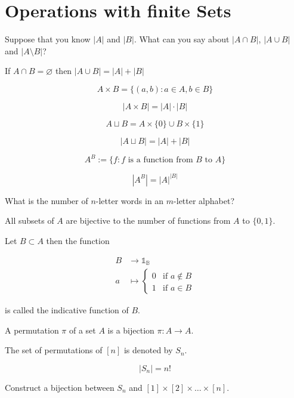 \section{Operations with finite Sets}
\begin{exercise}
Suppose that you know $|A|$ and $|B|$. What can you say about $|A\cap B|$, $|A\cup B|$ and $|A\setminus B|$?
\end{exercise}
\begin{definition}
If $A\cap B=\varnothing$ then $|A\cup B|=|A|+|B|$
\end{definition}
\begin{definition}
$$
A\times B=\{ (a,b):a\in A,b\in B \}
$$
\end{definition}
\begin{definition}
$$
|A\times B|=|A|\cdot |B|
$$
\end{definition}
\begin{definition}
$$
A\sqcup B=A\times \{ 0 \}\cup B\times \{ 1 \}
$$
\end{definition}
\begin{theorem}
$$
|A\sqcup B|=|A|+|B|
$$
\end{theorem}
\begin{definition}
$$
A^{B}:= \{ f:f\text{ is a function from }B \text{ to }A \}
$$
\end{definition}
\begin{theorem}
$$
|A^{B}|=|A|^{|B|}
$$
\end{theorem}
\begin{exercise}
What is the number of $n$-letter words in an $m$-letter alphabet?
\end{exercise}
\begin{remark}
All subsets of $A$ are bijective to the number of functions from $A$ to $\{ 0,1 \}$.

Let $B\subset A$ then the function

\begin{align*}
B & \to \mathbb{1_{B}} \\
a & \mapsto \begin{cases}
0 & \text{if } a\not\in B \\
1  & \text{if }a\in B
\end{cases}
\end{align*}

is called the indicative function of $B$.
\end{remark}
\begin{definition}
A permutation $\pi$ of a set $A$ is a bijection $\pi:A\to A$.
\end{definition}
\begin{notation}
The set of permutations of $[n]$ is denoted by $S_{n}$.
\end{notation}
\begin{theorem}
$$
|S_{n}|=n!
$$
\end{theorem}
\begin{exercise}
Construct a bijection between $S_{n}$ and $[1]\times[2]\times\dots \times [n]$.
\end{exercise}
